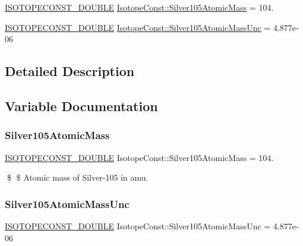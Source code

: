 \begin{DoxyCompactItemize}
\item 
\mbox{\hyperlink{group___isotope_const-_macros_ga8f45a7272ce02c0b4c65c44636ed719a}{I\+S\+O\+T\+O\+P\+E\+C\+O\+N\+S\+T\+\_\+\+D\+O\+U\+B\+LE}} \mbox{\hyperlink{group___isotope_const-_silver-_ag105_ga6f0f80b2851bdc62f31c7cf3d5da9dba}{Isotope\+Const\+::\+Silver105\+Atomic\+Mass}} = 104.
\item 
\mbox{\hyperlink{group___isotope_const-_macros_ga8f45a7272ce02c0b4c65c44636ed719a}{I\+S\+O\+T\+O\+P\+E\+C\+O\+N\+S\+T\+\_\+\+D\+O\+U\+B\+LE}} \mbox{\hyperlink{group___isotope_const-_silver-_ag105_ga38294b76507137fd988aad64432a4862}{Isotope\+Const\+::\+Silver105\+Atomic\+Mass\+Unc}} = 4.\+877e-\/06
\end{DoxyCompactItemize}


\subsection{Detailed Description}


\subsection{Variable Documentation}
\mbox{\label{group___isotope_const-_silver-_ag105_ga6f0f80b2851bdc62f31c7cf3d5da9dba}} 
\subsubsection{\texorpdfstring{Silver105\+Atomic\+Mass}{Silver105AtomicMass}}
{\footnotesize\ttfamily \mbox{\hyperlink{group___isotope_const-_macros_ga8f45a7272ce02c0b4c65c44636ed719a}{I\+S\+O\+T\+O\+P\+E\+C\+O\+N\+S\+T\+\_\+\+D\+O\+U\+B\+LE}} Isotope\+Const\+::\+Silver105\+Atomic\+Mass = 104.}

\$ \$ Atomic mass of Silver-\/105 in amu. \mbox{\label{group___isotope_const-_silver-_ag105_ga38294b76507137fd988aad64432a4862}} 
\subsubsection{\texorpdfstring{Silver105\+Atomic\+Mass\+Unc}{Silver105AtomicMassUnc}}
{\footnotesize\ttfamily \mbox{\hyperlink{group___isotope_const-_macros_ga8f45a7272ce02c0b4c65c44636ed719a}{I\+S\+O\+T\+O\+P\+E\+C\+O\+N\+S\+T\+\_\+\+D\+O\+U\+B\+LE}} Isotope\+Const\+::\+Silver105\+Atomic\+Mass\+Unc = 4.\+877e-\/06}

